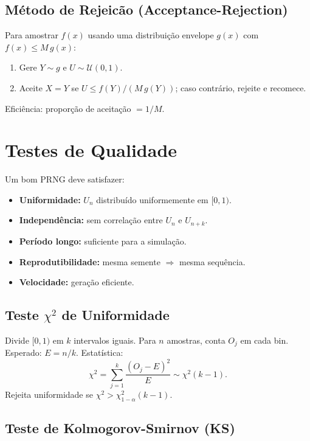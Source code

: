 \documentclass[12pt,a4paper]{article}
\begin{document}
\subsection{M\'etodo de Rejeic\~ao (Acceptance-Rejection)}

Para amostrar $f(x)$ usando uma distribui\c{c}\~ao envelope $g(x)$ com $f(x) \leq M\,g(x)$:
\begin{enumerate}
  \item Gere $Y \sim g$ e $U \sim \mathcal{U}(0,1)$.
  \item Aceite $X = Y$ se $U \leq f(Y) / (M\,g(Y))$; caso contr\'ario, rejeite e recomece.
\end{enumerate}
Efici\^encia: propor\c{c}\~ao de aceita\c{c}\~ao $= 1/M$.

\section{Testes de Qualidade}

Um bom PRNG deve satisfazer:

\begin{itemize}
  \item \textbf{Uniformidade:} $U_n$ distribu\'ido uniformemente em $[0,1)$.
  \item \textbf{Independ\^encia:} sem correla\c{c}\~ao entre $U_n$ e $U_{n+k}$.
  \item \textbf{Per\'iodo longo:} suficiente para a simula\c{c}\~ao.
  \item \textbf{Reprodutibilidade:} mesma semente $\Rightarrow$ mesma sequ\^encia.
  \item \textbf{Velocidade:} gera\c{c}\~ao eficiente.
\end{itemize}

\subsection{Teste \texorpdfstring{$\chi^2$}{chi2} de Uniformidade}

Divide $[0,1)$ em $k$ intervalos iguais. Para $n$ amostras, conta $O_j$ em cada bin. Esperado: $E = n/k$. Estat\'istica:
\[
  \chi^2 = \sum_{j=1}^k \frac{(O_j - E)^2}{E} \sim \chi^2(k-1).
\]
Rejeita uniformidade se $\chi^2 > \chi^2_{1-\alpha}(k-1)$.

\subsection{Teste de Kolmogorov-Smirnov (KS)}
\end{document}
